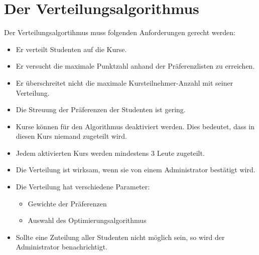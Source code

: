 \documentclass[12pt,a4paper]{article}
\begin{document}
    \section{Der Verteilungsalgorithmus}
    Der Verteilungsalgortihmus muss folgenden Anforderungen gerecht werden:
    \begin{itemize}
	\item Er verteilt Studenten auf die Kurse.
    \item Er versucht die maximale Punktzahl anhand der Präferenzlisten zu erreichen.
    \item Er überschreitet nicht die maximale Kursteilnehmer-Anzahl mit seiner Verteilung.
    \item Die Streuung der Präferenzen der Studenten ist gering.
    \item Kurse können für den Algorithmus deaktiviert werden. Dies bedeutet, dass in diesen Kurs niemand zugeteilt wird.
    \item Jedem aktivierten Kurs werden mindestens 3 Leute zugeteilt.
    \item Die Verteilung ist wirksam, wenn sie von einem Administrator bestätigt wird.
    \item Die Verteilung hat verschiedene Parameter:
    	\begin{itemize}
    	\item Gewichte der Präferenzen
    	\item Auswahl des Optimierungsalgorithmus %
    	\end{itemize}
    \item Sollte eine Zuteilung aller Studenten nicht möglich sein, so wird der Administrator benachrichtigt.
    \end{itemize}
    
\end{document}
